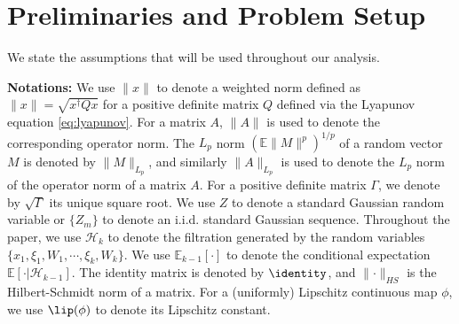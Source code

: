\documentclass[11pt]{article}
\begin{document}
\section{Preliminaries and Problem Setup}
We state the assumptions that will be used throughout our analysis. 


\textbf{Notations:} 
We use $\lVert x \rVert$ to denote a weighted norm defined as $\lVert x \rVert = \sqrt{x^\dagger Q x}$ for a positive definite matrix $Q$ defined via the Lyapunov equation \eqref{eq:lyapunov}. 
For a matrix $A$, $\lVert A \rVert$ is used to denote the corresponding operator norm. 
The $L_p$ norm $(\mathbb{E}\lVert M \rVert^p)^{1/p}$ of a random vector $M$ is denoted by $\lVert M \rVert_{L_p}$, and similarly $\lVert A \rVert_{L_p}$ is used to denote the $L_p$ norm of the operator norm of a matrix $A$. 
For a positive definite matrix $\Gamma$, we denote by $\sqrt{\Gamma}$ its unique square root. 
We use $Z$ to denote a standard Gaussian random variable or $\{Z_m\}$ to denote an i.i.d. standard Gaussian sequence. 
Throughout the paper, we use $\mathcal{H}_k$ to denote the filtration generated by the random variables $\{x_1, \xi_1, W_1, \cdots, \xi_{k}, W_{k}\}$. 
We use $\mathbb{E}_{k-1} [\cdot]$ to denote the conditional expectation $\mathbb{E}[\cdot | \mathcal{H}_{k-1}]$.
The identity matrix is denoted by $\identity$, and $\lVert \cdot \rVert_{HS}$ is the Hilbert-Schmidt norm of a matrix. 
For a (uniformly) Lipschitz continuous map $\phi$, we use $\lip(\phi)$ to denote its Lipschitz constant. 
\end{document}
